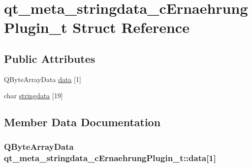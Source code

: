 \hypertarget{structqt__meta__stringdata__c_ernaehrung_plugin__t}{}\section{qt\+\_\+meta\+\_\+stringdata\+\_\+c\+Ernaehrung\+Plugin\+\_\+t Struct Reference}
\label{structqt__meta__stringdata__c_ernaehrung_plugin__t}
\subsection*{Public Attributes}
\begin{DoxyCompactItemize}
\item 
Q\+Byte\+Array\+Data \hyperlink{structqt__meta__stringdata__c_ernaehrung_plugin__t_ab751921bc4979101275003e865982c9e}{data} \mbox{[}1\mbox{]}
\item 
char \hyperlink{structqt__meta__stringdata__c_ernaehrung_plugin__t_adc7272a800db98fd08e9d093f108ea99}{stringdata} \mbox{[}19\mbox{]}
\end{DoxyCompactItemize}


\subsection{Member Data Documentation}
\subsubsection[{\texorpdfstring{data}{data}}]{\setlength{\rightskip}{0pt plus 5cm}Q\+Byte\+Array\+Data qt\+\_\+meta\+\_\+stringdata\+\_\+c\+Ernaehrung\+Plugin\+\_\+t\+::data\mbox{[}1\mbox{]}}\hypertarget{structqt__meta__stringdata__c_ernaehrung_plugin__t_ab751921bc4979101275003e865982c9e}{}\label{structqt__meta__stringdata__c_ernaehrung_plugin__t_ab751921bc4979101275003e865982c9e}
